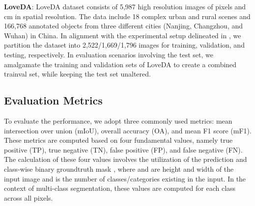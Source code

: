 \documentclass[journal]{IEEEtran}
\begin{document}
\noindent\textbf{LoveDA}: LoveDA dataset \cite{wang2021loveda} consists of 5,987 high resolution images of  pixels and  cm in spatial resolution. The data include 18 complex urban and rural scenes and 166,768 annotated objects from three different cities (Nanjing, Changzhou, and Wuhan) in China. 
In alignment with the experimental setup delineated in \cite{wang2021loveda}, we partition the dataset into 2,522/1,669/1,796 images for training, validation, and testing, respectively. In evaluation scenarios involving the test set, we amalgamate the training and validation sets of LoveDA to create a combined trainval set, while keeping the test set unaltered.

\subsection{Evaluation Metrics}
To evaluate the performance, we adopt three commonly used metrics: mean intersection over union (mIoU), overall accuracy (OA), and mean F1 score (mF1). 
These metrics are computed based on four fundamental values, namely true positive (TP), true negative (TN), false positive (FP), and false negative (FN). 
The calculation of these four values involves the utilization of the prediction  and class-wise binary groundtruth mask , where  and  are height and width of the input image and  is the number of classes/categories existing in the input. In the context of multi-class segmentation, these values are computed for each class  across all pixels.
\end{document}
